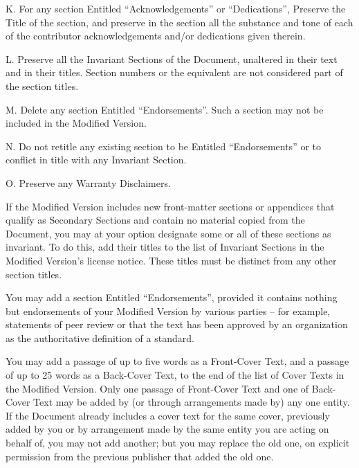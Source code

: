 {\tiny{}K. For any section Entitled ``Acknowledgements'' or ``Dedications'',
Preserve the Title of the section, and preserve in the section all
the substance and tone of each of the contributor acknowledgements
and/or dedications given therein.}{\tiny\par}

{\tiny{}L. Preserve all the Invariant Sections of the Document, unaltered
in their text and in their titles. Section numbers or the equivalent
are not considered part of the section titles.}{\tiny\par}

{\tiny{}M. Delete any section Entitled ``Endorsements''. Such a
section may not be included in the Modified Version.}{\tiny\par}

{\tiny{}N. Do not retitle any existing section to be Entitled ``Endorsements''
or to conflict in title with any Invariant Section.}{\tiny\par}

{\tiny{}O. Preserve any Warranty Disclaimers.}{\tiny\par}

{\tiny{}If the Modified Version includes new front-matter sections
or appendices that qualify as Secondary Sections and contain no material
copied from the Document, you may at your option designate some or
all of these sections as invariant. To do this, add their titles to
the list of Invariant Sections in the Modified Version's license notice.
These titles must be distinct from any other section titles.}{\tiny\par}

{\tiny{}You may add a section Entitled ``Endorsements'', provided
it contains nothing but endorsements of your Modified Version by various
parties – for example, statements of peer review or that the text
has been approved by an organization as the authoritative definition
of a standard.}{\tiny\par}

{\tiny{}You may add a passage of up to five words as a Front-Cover
Text, and a passage of up to 25 words as a Back-Cover Text, to the
end of the list of Cover Texts in the Modified Version. Only one passage
of Front-Cover Text and one of Back-Cover Text may be added by (or
through arrangements made by) any one entity. If the Document already
includes a cover text for the same cover, previously added by you
or by arrangement made by the same entity you are acting on behalf
of, you may not add another; but you may replace the old one, on explicit
permission from the previous publisher that added the old one.}{\tiny\par}

